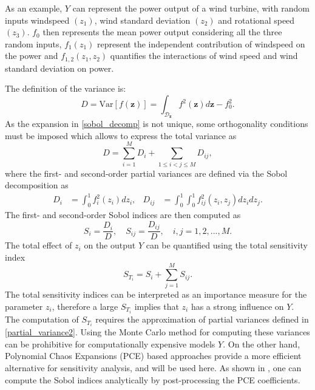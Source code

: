 As an example, $Y$ can represent the power output of a wind turbine, with random inputs windspeed $(z_1)$, wind standard deviation $(z_2)$ and rotational speed $(z_3)$. $f_0$ then represents the mean power output considering all the three random inputs, $f_1(z_1)$ represent the independent contribution of windspeed on the power and $f_{1,2}(z_1,z_2)$ quantifies the interactions of wind speed and wind standard deviation on power. 

The definition of the variance is:
\begin{equation}\label{tot_var}
D = \text{Var}[f(\mathbf{z})] = \int_{\mathcal{D}_{\mathbf{z}}} f^2(\mathbf{z})d\mathbf{z} - f_0^2.
\end{equation}
As the expansion in \eqref{sobol_decomp} is not unique, some orthogonality conditions must be imposed  \cite{Rabitz1999,SOBOL2001271} which allows to express the total variance as
\begin{equation}
D = \sum_{i=1}^M D_i + \sum_{1\leq i<j\leq M} D_{ij},
\end{equation}
where the first- and second-order partial variances are defined via the Sobol decomposition as
\begin{align}
D_i &= \int_{0}^{1} f^2_i(z_i)dz_i, & D_{ij} &= \int_{0}^{1} \int_{0}^{1} f^2_{ij}(z_i,z_j)dz_idz_j \label{partial_variance2}. 
\end{align}
The first- and second-order Sobol indices are then computed as
\begin{equation}\label{sobol_ind}
S_i = \frac{D_i}{D}, \quad S_{ij} = \frac{D_{ij}}{D}, \quad i,j=1,2, ..., M.
\end{equation}
The total effect of $z_i$ on the output $Y$ can be quantified using the total sensitivity index
\begin{equation}
S_{T_i} = S_i + \sum_{j=1}^M S_{ij}.
\end{equation}
The total sensitivity indices can be interpreted as an importance measure for the parameter $z_i$, therefore a large $S_{T_i}$ implies that $z_i$ has a strong influence on $Y$. The computation of $S_{T_i}$ requires the approximation of partial variances defined in \eqref{partial_variance2}. Using the Monte Carlo method for computing these variances can be prohibitive for computationally expensive models $Y$. On the other hand, Polynomial Chaos Expansions (PCE) based approaches provide a more efficient alternative for sensitivity analysis, and will be used here. As shown in \cite{SUDRET2008964}, one can compute the Sobol indices analytically by post-processing the PCE coefficients.

